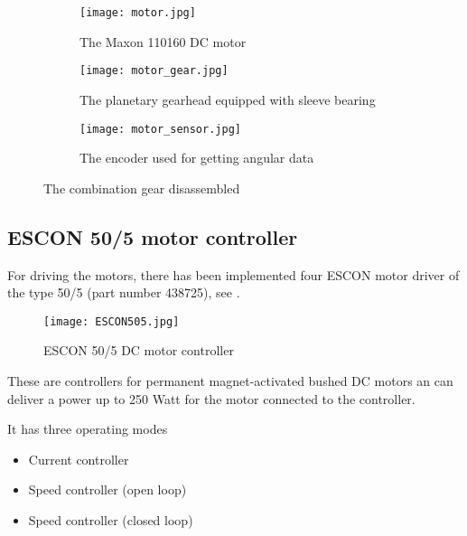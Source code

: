 \begin{figure}[H]
	\centering
	\begin{subfigure}{.32\textwidth}
		\vspace{0pt}
		\centering
		\texttt{[image: motor.jpg]}
		\caption{The Maxon 110160 \newline DC motor}
		\label{fig:motor}
	\end{subfigure}
	\begin{subfigure}{.32\textwidth}
		\centering
		\texttt{[image: motor\_gear.jpg]}
		\caption{The planetary gearhead equipped with sleeve bearing}
		\label{fig:motor_gear}
	\end{subfigure}
	\begin{subfigure}{.32\textwidth}
	\hspace{5pt}
		\centering
		\texttt{[image: motor\_sensor.jpg]}
		\caption{The encoder used for getting angular data}
		\label{fig:motor_sensor}
	\end{subfigure}
	\caption{The combination gear disassembled}
	\label{fig:Full_motor _dis}
\end{figure}


\subsection{ESCON 50/5 motor controller}
For driving the motors, there has been implemented four ESCON motor driver of the type 50/5 (part number 438725), see . 

\begin{figure}[H]
	\centering
		\centering
		\texttt{[image: ESCON505.jpg]}
		\caption{ESCON 50/5 DC motor controller\cite{ESCON_motor_controller}}
		\label{fig:ESCON505}
\end{figure}

These are controllers for permanent magnet-activated bushed DC motors an can deliver a power up to 250 Watt for the motor connected to the controller. 

It has three operating modes

\begin{itemize}
\item Current controller
\item Speed controller (open loop)
\item Speed controller (closed loop)
\end{itemize}





